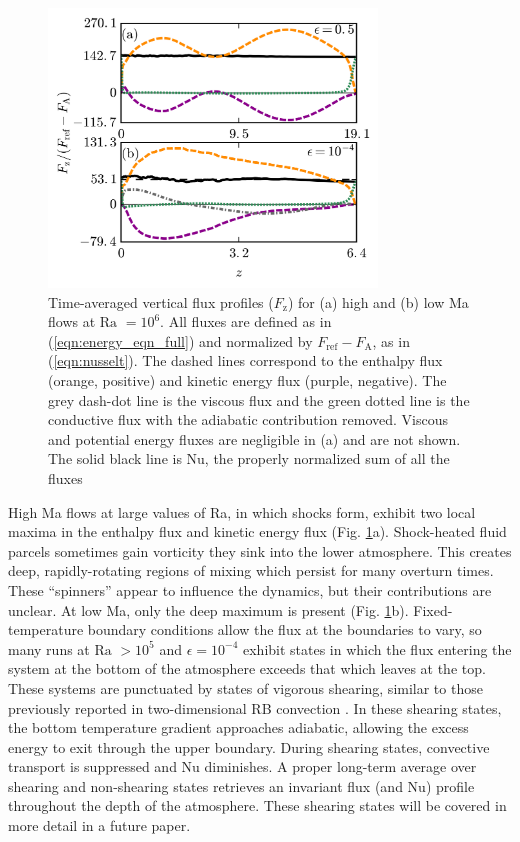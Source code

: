 \documentclass[aps, prl, twocolumn, nofootinbib, groupedaddress, amsfonts, amssymb, amsmath]{revtex4-1}
\begin{document}
\begin{figure}[t]
\includegraphics[width=3.4375in]{./figs/fluxes_fig.png}
\caption{Time-averaged vertical flux profiles ($F_{\text{z}}$)
for (a) high and (b) low Ma flows at $\text{Ra }= 10^6$.  
All fluxes are defined as in (\ref{eqn:energy_eqn_full}) and 
normalized by $F_{\text{ref}} - F_{\text{A}}$, as in (\ref{eqn:nusselt}).
The dashed lines correspond to the
enthalpy flux (orange, positive) and kinetic energy flux (purple, negative).  
The grey dash-dot line is the
viscous flux and the green dotted line is the conductive flux with the 
adiabatic contribution removed. Viscous and
potential energy fluxes are negligible in (a) and are not shown.    
The solid black line is
Nu, the properly normalized sum of all the fluxes \label{fig:flux_profiles} }
\end{figure}

High Ma flows at large values of Ra, in which shocks form, exhibit two 
local maxima in the enthalpy flux and kinetic energy flux (Fig. \ref{fig:flux_profiles}a).
Shock-heated fluid parcels sometimes gain vorticity
they sink into the lower atmosphere.
This creates deep, rapidly-rotating regions
of mixing which persist for many overturn times. These ``spinners'' appear to
influence the dynamics, but their contributions are unclear.
At low Ma, only the deep maximum is present (Fig. \ref{fig:flux_profiles}b).  
Fixed-temperature boundary conditions allow the flux at the 
boundaries to vary, so many runs at $\text{Ra }> 10^5$
and $\epsilon = 10^{-4}$ exhibit states in which the flux 
entering the system at the bottom of the atmosphere 
exceeds that which leaves at the top.  
These systems are punctuated by states of vigorous shearing, similar to those previously
reported in two-dimensional RB convection \cite{goluskin&all2014}.  
In these shearing states, the bottom temperature
gradient approaches adiabatic, 
allowing the excess energy to exit through the upper boundary.  
During shearing states, convective transport is suppressed and Nu diminishes.
A proper long-term average over shearing
and non-shearing states retrieves an invariant flux (and Nu) profile throughout the depth
of the atmosphere. 
These shearing states will be covered in more detail in a future paper. 
\end{document}
